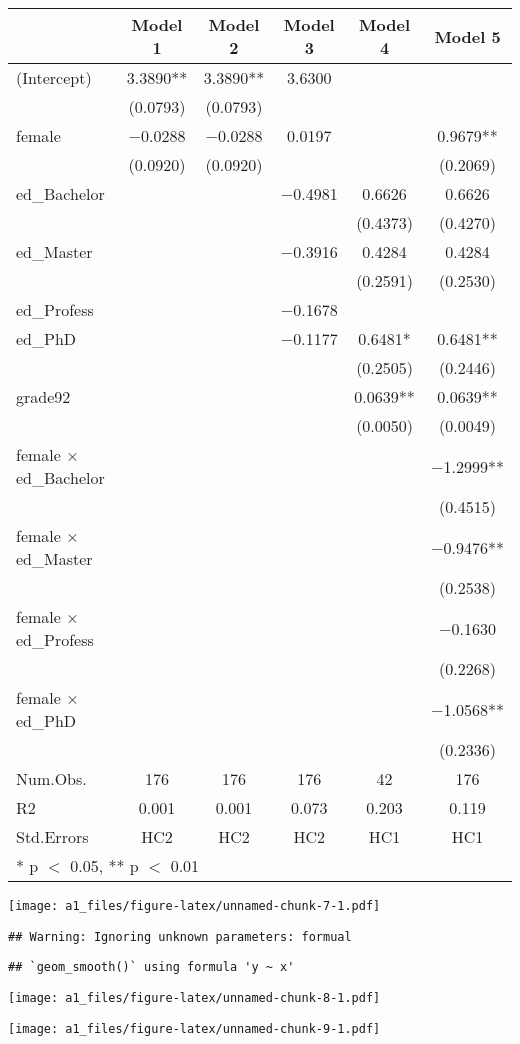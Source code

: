 \documentclass[
]{article}
\begin{document}
\begin{table}
\centering
\begin{tabular}[t]{lccccc}
\toprule
  & Model 1 & Model 2 & Model 3 & Model 4 & Model 5\\
\midrule
(Intercept) & \num{3.3890}** & \num{3.3890}** & \num{3.6300} &  & \\
 & (\num{0.0793}) & (\num{0.0793}) &  &  & \\
female & \num{-0.0288} & \num{-0.0288} & \num{0.0197} &  & \num{0.9679}**\\
 & (\num{0.0920}) & (\num{0.0920}) &  &  & (\num{0.2069})\\
ed\_Bachelor &  &  & \num{-0.4981} & \num{0.6626} & \num{0.6626}\\
 &  &  &  & (\num{0.4373}) & (\num{0.4270})\\
ed\_Master &  &  & \num{-0.3916} & \num{0.4284} & \num{0.4284}\\
 &  &  &  & (\num{0.2591}) & (\num{0.2530})\\
ed\_Profess &  &  & \num{-0.1678} &  & \\
ed\_PhD &  &  & \num{-0.1177} & \num{0.6481}* & \num{0.6481}**\\
 &  &  &  & (\num{0.2505}) & (\num{0.2446})\\
grade92 &  &  &  & \num{0.0639}** & \num{0.0639}**\\
 &  &  &  & (\num{0.0050}) & (\num{0.0049})\\
female × ed\_Bachelor &  &  &  &  & \num{-1.2999}**\\
 &  &  &  &  & (\num{0.4515})\\
female × ed\_Master &  &  &  &  & \num{-0.9476}**\\
 &  &  &  &  & (\num{0.2538})\\
female × ed\_Profess &  &  &  &  & \num{-0.1630}\\
 &  &  &  &  & (\num{0.2268})\\
female × ed\_PhD &  &  &  &  & \num{-1.0568}**\\
 &  &  &  &  & (\num{0.2336})\\
\midrule
Num.Obs. & \num{176} & \num{176} & \num{176} & \num{42} & \num{176}\\
R2 & \num{0.001} & \num{0.001} & \num{0.073} & \num{0.203} & \num{0.119}\\
Std.Errors & HC2 & HC2 & HC2 & HC1 & HC1\\
\bottomrule
\multicolumn{6}{l}{\rule{0pt}{1em}* p $<$ 0.05, ** p $<$ 0.01}\\
\end{tabular}
\end{table}

\texttt{[image: a1\_files/figure-latex/unnamed-chunk-7-1.pdf]}

\begin{verbatim}
## Warning: Ignoring unknown parameters: formual
\end{verbatim}

\begin{verbatim}
## `geom_smooth()` using formula 'y ~ x'
\end{verbatim}

\texttt{[image: a1\_files/figure-latex/unnamed-chunk-8-1.pdf]}

\texttt{[image: a1\_files/figure-latex/unnamed-chunk-9-1.pdf]}
\end{document}
